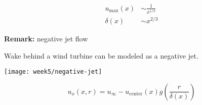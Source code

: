 \begin{align}
u_\mathrm{max}(x)&\sim\frac{1}{x^{1/3}}\\
\delta(x)&\sim x^{2/3}
\end{align}

\begin{framed}
\textbf{Remark:} negative jet flow

Wake behind a wind turbine can be modeled as a negative jet.

{\center
\texttt{[image: week5/negative-jet]}\\
}

\begin{equation}
u_x(x,r) = u_\infty-u_\mathrm{center}(x)g\left(\frac{r}{\delta(x)}\right)
\end{equation}
\end{framed}